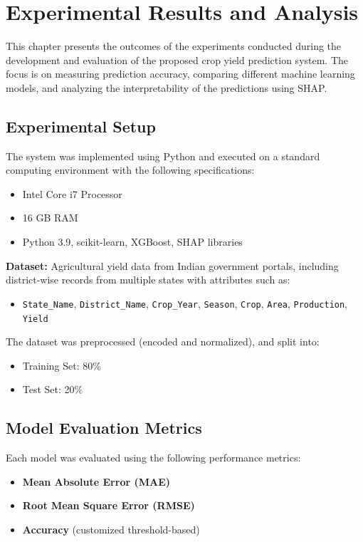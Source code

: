 \documentclass[a4paper,11pt,oneside]{book}
\begin{document}
\newpage


\chapter{Experimental Results and Analysis}

This chapter presents the outcomes of the experiments conducted during the development and evaluation of the proposed crop yield prediction system. The focus is on measuring prediction accuracy, comparing different machine learning models, and analyzing the interpretability of the predictions using SHAP.

\section{Experimental Setup}

The system was implemented using Python and executed on a standard computing environment with the following specifications:
\begin{itemize}
    \item Intel Core i7 Processor
    \item 16 GB RAM
    \item Python 3.9, scikit-learn, XGBoost, SHAP libraries
\end{itemize}

\textbf{Dataset:} Agricultural yield data from Indian government portals, including district-wise records from multiple states with attributes such as:
\begin{itemize}
    \item \texttt{State\_Name}, \texttt{District\_Name}, \texttt{Crop\_Year}, \texttt{Season}, \texttt{Crop}, \texttt{Area}, \texttt{Production}, \texttt{Yield}
\end{itemize}

The dataset was preprocessed (encoded and normalized), and split into:
\begin{itemize}
    \item Training Set: 80\%
    \item Test Set: 20\%
\end{itemize}

\section{Model Evaluation Metrics}

Each model was evaluated using the following performance metrics:
\begin{itemize}
    \item \textbf{Mean Absolute Error (MAE)}
    \item \textbf{Root Mean Square Error (RMSE)}
    \item \textbf{Accuracy} (customized threshold-based)
\end{itemize}
\end{document}
